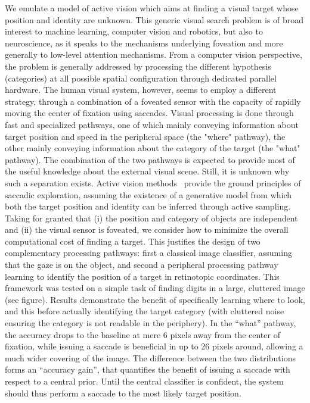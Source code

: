 We emulate a model of active vision which aims at finding a visual target whose position and identity are unknown.
This generic visual search problem is of broad interest to machine learning, computer vision and robotics, but also to neuroscience, as it speaks to the mechanisms underlying foveation and more generally to low-level attention mechanisms. From a computer vision perspective, the problem is generally addressed by processing the different hypothesis (categories) at all possible spatial configuration through dedicated parallel hardware. The human visual system, however, seems to employ a different strategy, through a combination of a foveated sensor with the capacity of rapidly moving the center of fixation using saccades. 
Visual processing is done through fast and specialized pathways, one of which mainly conveying information about target position and speed in the peripheral space (the "where" pathway), the other mainly conveying  information about the category of the target (the "what" pathway). The combination of the two pathways is expected to provide most of the useful knowledge about the external visual scene. Still, it is unknown why such a separation exists.
Active vision methods~\citep{Najemnik05,Butko2010infomax,Friston12,dauce2018active} provide the ground principles of saccadic exploration, assuming the existence of a generative model from which both the target position and identity can be inferred through active sampling.
Taking for granted that (i) the position and category of objects are independent and 
(ii) the visual sensor is foveated, we consider how to minimize the overall computational cost of finding a target. 
This justifies the design of two complementary processing pathways: first a classical image classifier, assuming that the gaze is on the object, and second a peripheral processing pathway learning to identify the position of a target in retinotopic coordinates. 
This framework was tested on a simple task of finding digits in a large, cluttered image (see figure). Results demonstrate the benefit of specifically learning where to look, and this before actually identifying the target category (with cluttered noise ensuring the category is not readable in the periphery). 
In the ``what'' pathway, the accuracy drops to the baseline at mere 6 pixels away from the center of fixation, while issuing a saccade is beneficial in up to 26 pixels around, allowing a much wider covering of the image. The difference between the two distributions forms an ``accuracy gain'', that quantifies the benefit of issuing a saccade with respect to a central prior. Until the central classifier is confident, the system should thus perform a saccade to the most likely target position. 
